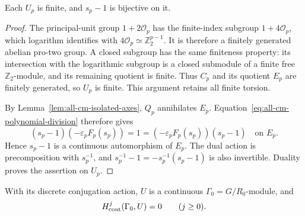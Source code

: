\begin{lemma}\label{lem:all-cm-coordinate-module}
Each \(U_p\) is finite, and \(s_p-1\) is bijective on it.
\end{lemma}

\begin{proof}
The principal-unit group \(1+2\mathcal O_p\) has the
finite-index subgroup \(1+4\mathcal O_p\), which logarithm
identifies with \(4\mathcal O_p\simeq\mathbb Z_2^{p-1}\).
It is therefore a finitely generated abelian pro-two group.
A closed subgroup has the same finiteness property:
its intersection with the logarithmic subgroup is a
closed submodule of a finite free \(\mathbb Z_2\)-module,
and its remaining quotient is finite.
Thus \(C_p\) and its quotient \(E_p\) are finitely generated,
so \(U_p\) is finite. This argument retains all finite torsion.

By Lemma~\ref{lem:all-cm-isolated-axes}, \(Q_p\) annihilates
\(E_p\). Equation~\eqref{eq:all-cm-polynomial-division}
therefore gives
\[
 (s_p-1)(-\varepsilon_p F_p(s_p))
       =1=(-\varepsilon_p F_p(s_p))(s_p-1)
                         \quad\text{on }E_p.
\]
Hence \(s_p-1\) is a continuous automorphism of \(E_p\).
The dual action is precomposition with \(s_p^{-1}\),
and \(s_p^{-1}-1=-s_p^{-1}(s_p-1)\) is also invertible.
Duality proves the assertion on \(U_p\).
\end{proof}

\begin{corollary}\label{cor:all-cm-conjugation-vanishing}
With its discrete conjugation action, \(U\) is a continuous
\(\Gamma_0=G/R_0\)-module, and
\begin{equation}
                       H^j_{\rm cont}(\Gamma_0,U)=0
                                      \qquad(j\ge0).
 \label{eq:all-cm-conjugation-cohomology}
\end{equation}
\end{corollary}

